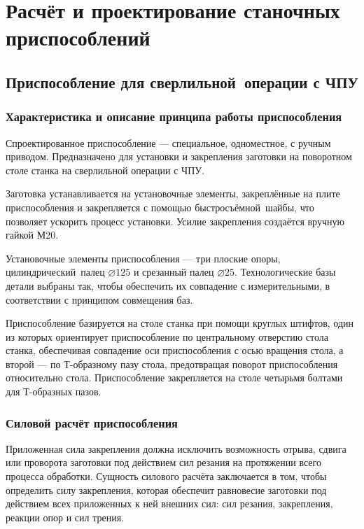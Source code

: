 \documentclass[14pt,russian,a4paper]{extreport}
\begin{document}
\chapter{Расчёт и проектирование станочных приспособлений}

\section{Приспособление для сверлильной операции с ЧПУ}

\subsection{Характеристика и описание принципа работы приспособления}

Спроектированное приспособление --- специальное, одноместное, с ручным приводом. Предназначено для установки и закрепления заготовки на поворотном столе станка на сверлильной операции с ЧПУ.

Заготовка устанавливается на установочные элементы, закреплённые на плите приспособления и закрепляется с помощью быстросъёмной шайбы, что позволяет ускорить процесс установки. Усилие закрепления создаётся вручную гайкой М20.

Установочные элементы приспособления --- три плоские опоры, цилиндрический палец $\diameter 125$ и срезанный палец $\diameter 25$. Технологические базы детали выбраны так, чтобы обеспечить их совпадение с измерительными, в соответствии с принципом совмещения баз.

Приспособление базируется на столе станка при помощи круглых штифтов, один из которых ориентирует приспособление по центральному отверстию стола станка, обеспечивая совпадение оси приспособления с осью вращения стола, а второй --- по Т-образному пазу стола, предотвращая поворот приспособления относительно стола. Приспособление закрепляется на столе четырьмя болтами для Т-образных пазов.

\subsection{Силовой расчёт приспособления}

Приложенная сила закрепления должна исключить возможность отрыва, сдвига или проворота заготовки под действием сил резания на протяжении всего процесса обработки. Сущность силового расчёта заключается в том, чтобы определить силу закрепления, которая обеспечит равновесие заготовки под действием всех приложенных к ней внешних сил: сил резания, закрепления, реакции опор и сил трения.
\end{document}
